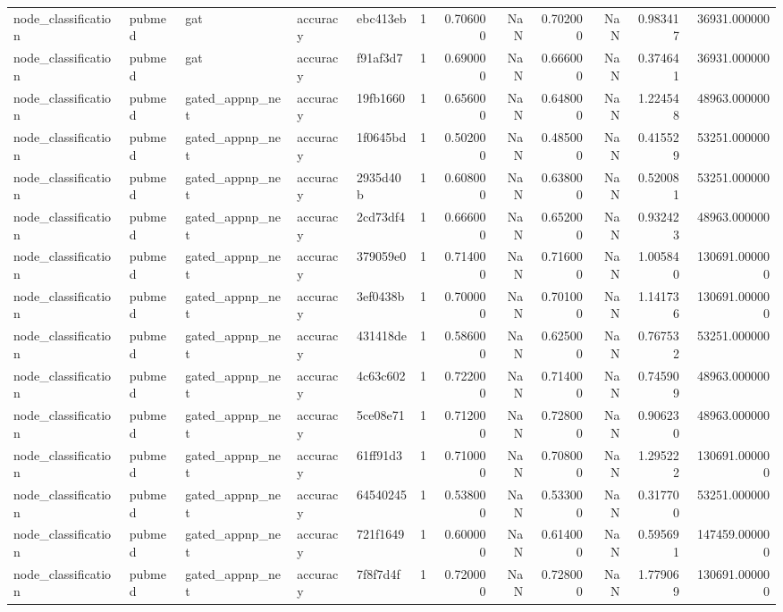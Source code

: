 \begin{tabular}{lllllrrrrrrr}
node_classification & pubmed & gat & accuracy & ebc413eb & 1 & 0.706000 & NaN & 0.702000 & NaN & 0.983417 & 36931.000000 \\
node_classification & pubmed & gat & accuracy & f91af3d7 & 1 & 0.690000 & NaN & 0.666000 & NaN & 0.374641 & 36931.000000 \\
node_classification & pubmed & gated_appnp_net & accuracy & 19fb1660 & 1 & 0.656000 & NaN & 0.648000 & NaN & 1.224548 & 48963.000000 \\
node_classification & pubmed & gated_appnp_net & accuracy & 1f0645bd & 1 & 0.502000 & NaN & 0.485000 & NaN & 0.415529 & 53251.000000 \\
node_classification & pubmed & gated_appnp_net & accuracy & 2935d40b & 1 & 0.608000 & NaN & 0.638000 & NaN & 0.520081 & 53251.000000 \\
node_classification & pubmed & gated_appnp_net & accuracy & 2cd73df4 & 1 & 0.666000 & NaN & 0.652000 & NaN & 0.932423 & 48963.000000 \\
node_classification & pubmed & gated_appnp_net & accuracy & 379059e0 & 1 & 0.714000 & NaN & 0.716000 & NaN & 1.005840 & 130691.000000 \\
node_classification & pubmed & gated_appnp_net & accuracy & 3ef0438b & 1 & 0.700000 & NaN & 0.701000 & NaN & 1.141736 & 130691.000000 \\
node_classification & pubmed & gated_appnp_net & accuracy & 431418de & 1 & 0.586000 & NaN & 0.625000 & NaN & 0.767532 & 53251.000000 \\
node_classification & pubmed & gated_appnp_net & accuracy & 4c63c602 & 1 & 0.722000 & NaN & 0.714000 & NaN & 0.745909 & 48963.000000 \\
node_classification & pubmed & gated_appnp_net & accuracy & 5ce08e71 & 1 & 0.712000 & NaN & 0.728000 & NaN & 0.906230 & 48963.000000 \\
node_classification & pubmed & gated_appnp_net & accuracy & 61ff91d3 & 1 & 0.710000 & NaN & 0.708000 & NaN & 1.295222 & 130691.000000 \\
node_classification & pubmed & gated_appnp_net & accuracy & 64540245 & 1 & 0.538000 & NaN & 0.533000 & NaN & 0.317700 & 53251.000000 \\
node_classification & pubmed & gated_appnp_net & accuracy & 721f1649 & 1 & 0.600000 & NaN & 0.614000 & NaN & 0.595691 & 147459.000000 \\
node_classification & pubmed & gated_appnp_net & accuracy & 7f8f7d4f & 1 & 0.720000 & NaN & 0.728000 & NaN & 1.779069 & 130691.000000 \\

\end{tabular}
